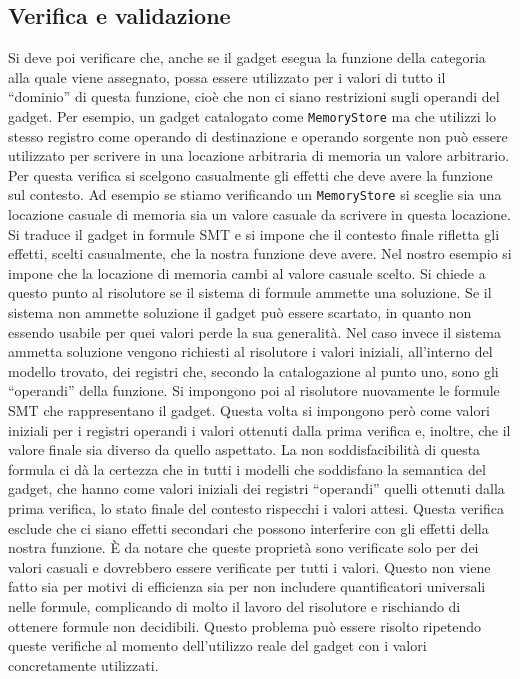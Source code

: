 \subsection{Verifica e validazione}\label{s:verifica_validazione}
Si deve poi verificare che, anche se il gadget esegua la funzione
della categoria alla quale viene assegnato, possa essere utilizzato
per i valori di tutto il ``dominio'' di questa funzione, cioè che non
ci siano restrizioni sugli operandi del gadget. Per esempio, un gadget
catalogato come \lstinline{MemoryStore} ma che utilizzi lo stesso
registro come operando di destinazione e operando sorgente non può
essere utilizzato per scrivere in una locazione arbitraria di memoria
un valore arbitrario. Per questa verifica si scelgono casualmente gli
effetti che deve avere la funzione sul contesto. Ad esempio se stiamo
verificando un \lstinline{MemoryStore} si sceglie sia una locazione
casuale di memoria sia un valore casuale da scrivere in questa
locazione. Si traduce il gadget in formule SMT e si impone che il
contesto finale rifletta gli effetti, scelti casualmente, che la
nostra funzione deve avere. Nel nostro esempio si impone che la
locazione di memoria cambi al valore casuale scelto. Si chiede a
questo punto al risolutore se il sistema di formule ammette una
soluzione. Se il sistema non ammette soluzione il gadget può essere
scartato, in quanto non essendo usabile per quei valori perde la sua
generalità. Nel caso invece il sistema ammetta soluzione vengono
richiesti al risolutore i valori iniziali, all'interno del modello
trovato, dei registri che, secondo la catalogazione al punto uno,
sono gli ``operandi'' della funzione. Si impongono poi al risolutore
nuovamente le formule SMT che rappresentano il gadget.  Questa volta
si impongono però come valori iniziali per i registri operandi i
valori ottenuti dalla prima verifica e, inoltre, che il valore finale
sia diverso da quello aspettato. La non soddisfacibilità di questa
formula ci dà la certezza che in tutti i modelli che soddisfano la
semantica del gadget, che hanno come valori iniziali dei registri
``operandi'' quelli ottenuti dalla prima verifica, lo stato finale del
contesto rispecchi i valori attesi. Questa verifica esclude che ci
siano effetti secondari che possono interferire con gli effetti della
nostra funzione. È da notare che queste proprietà sono verificate solo
per dei valori casuali e dovrebbero essere verificate per tutti i
valori. Questo non viene fatto sia per motivi di efficienza sia per
non includere quantificatori universali nelle formule, complicando di
molto il lavoro del risolutore e rischiando di ottenere formule non
decidibili. Questo problema può essere risolto ripetendo queste
verifiche al momento dell'utilizzo reale del gadget con i valori
concretamente utilizzati.

